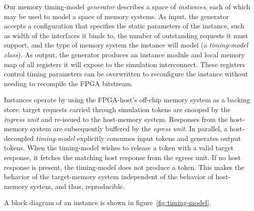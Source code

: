 
Our memory timing-model \textit{generator} describes a space of
\textit{instances}, each of which may be used to model a space of
memory systems. As input, the generator accepts a configuration that specifies
the static parameters of the instance,  such as width of the interfaces it
binds to, the number of outstanding requests it must support, and the type of
memory system the instance will model (a \emph{timing-model class}). As output,
the generator produces an instance module and local memory map of all registers
it will expose to the simulation interconnect. These registers control timing
parameters can be overwritten to reconfigure the instance without needing to
recompile the FPGA bitstream.

Instances operate by using the FPGA-host's off-chip memory system as a backing
store: target requests carried through simulation tokens are snooped by the
\emph{ingress unit} and re-issued to the host-memory system. Responses from the
host-memory system are subsequently buffered by the \emph{egress unit}. In
parallel, a host-decoupled \emph{timing-model} explicitly consumes input tokens
and generates output tokens. When the timing-model wishes to release a token
with a valid target response, it fetches the matching host response from the
egress unit. If no host response is present, the timing-model does not produce
a token. This makes the behavior of the target-memory system independent of the
behavior of host-memory system, and thus, reproducible.

A block diagram of an instance is shown in figure~\ref{fig:timing-model}.

